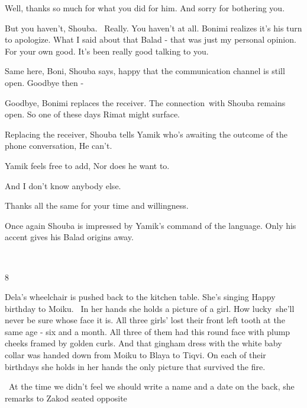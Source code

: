 \documentclass[12pt]{book}
\begin{document}
{\textquotedbl}Well, thanks so much for what you did for him. And sorry for bothering you.{\textquotedbl}

{\textquotedbl}But you haven't, Shouba. \ Really. You haven't at all.{\textquotedbl} Bonimi realizes it's his turn to
apologize. {\textquotedbl}What I said about that Balad - that was just my personal opinion. For your own good. It's
been really good{ }talking to you.{\textquotedbl}

{\textquotedbl}Same here, Boni,{\textquotedbl} Shouba says, happy that the communication channel is still open.
{\textquotedbl}Goodbye then -{\textquotedbl}

{\textquotedbl}Goodbye,{\textquotedbl} Bonimi replaces the receiver. The connection~with Shouba remains open. So one of
these days Rimat might surface.

Replacing the receiver, Shouba tells Yamik who's awaiting the outcome of the phone conversation, {\textquotedbl}He
can't.{\textquotedbl}

Yamik feels free to add, {\textquotedbl}Nor does he want to.{\textquotedbl}

{\textquotedbl}And I don't know anybody else.{\textquotedbl}

{\textquotedbl}Thanks all the same for your time and willingness.{\textquotedbl}

Once again Shouba is impressed by Yamik's command of the language. Only his accent gives his Balad origins away.

~

8

Dela's wheelchair is pushed back to the kitchen table. She's singing {\textquotedbl}Happy birthday to
Moiku{\textquotedbl}. ~In her hands she holds a picture of a girl. How lucky~she'll never be sure whose face it is. All
three girls' lost their front left tooth at the same age - six and a month. All three of them had this round face with
plump cheeks framed by golden curls. And that gingham dress with the white baby collar was handed down from Moiku to
Blaya to Tiqvi. On each of their birthdays she holds in her hands the only picture that survived the fire.

\ {\textquotedbl}At the time we didn't feel we should write a name and a date on the back,{\textquotedbl} she remarks to
Zakod seated opposite
\end{document}
